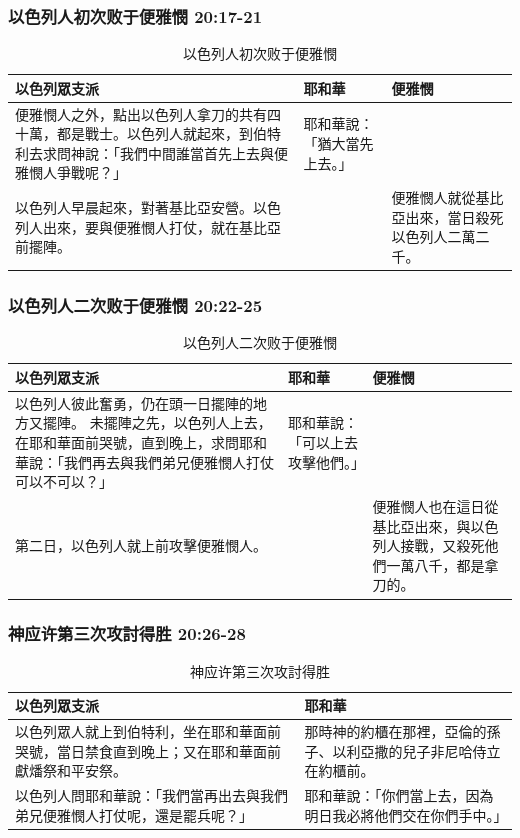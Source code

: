 \subsubsection{以色列人初次败于便雅憫 20:17-21}
\begin{table}[H]
\centering
\begin{tabular}{p{8.6cm}|p{2cm}|p{5.5cm}}\hline
以色列眾支派&耶和華&便雅憫\\\hline
便雅憫人之外，點出以色列人拿刀的共有四十萬，都是戰士。以色列人就起來，到伯特利去求問神說：「我們中間誰當首先上去與便雅憫人爭戰呢？」
&耶和華說：「猶大當先上去。」&\\\hline
以色列人早晨起來，對著基比亞安營。以色列人出來，要與便雅憫人打仗，就在基比亞前擺陣。 &&便雅憫人就從基比亞出來，當日殺死以色列人二萬二千。\\\hline
\end{tabular}
\caption{以色列人初次败于便雅憫}
\end{table}  


\subsubsection{以色列人二次败于便雅憫 20:22-25}
\begin{table}[H]
\centering
\begin{tabular}{p{9.6cm}|p{2.5cm}|p{}}\hline
以色列眾支派&耶和華&便雅憫\\\hline
以色列人彼此奮勇，仍在頭一日擺陣的地方又擺陣。 未擺陣之先，以色列人上去，在耶和華面前哭號，直到晚上，求問耶和華說：「我們再去與我們弟兄便雅憫人打仗可以不可以？」
&耶和華說：「可以上去攻擊他們。」&\\\hline
第二日，以色列人就上前攻擊便雅憫人。&&便雅憫人也在這日從基比亞出來，與以色列人接戰，又殺死他們一萬八千，都是拿刀的。\\\hline
\end{tabular}
\caption{以色列人二次败于便雅憫 }
\end{table}  


\subsubsection{神应许第三次攻討得胜 20:26-28}
\begin{table}[H]
\centering
\begin{tabular}{p{9.6cm}|p{7.5cm}}\hline
以色列眾支派&耶和華\\\hline
以色列眾人就上到伯特利，坐在耶和華面前哭號，當日禁食直到晚上；又在耶和華面前獻燔祭和平安祭。
&那時神的約櫃在那裡，亞倫的孫子、以利亞撒的兒子非尼哈侍立在約櫃前。\\\hline
以色列人問耶和華說：「我們當再出去與我們弟兄便雅憫人打仗呢，還是罷兵呢？」&耶和華說：「你們當上去，因為明日我必將他們交在你們手中。」\\\hline
\end{tabular}
\caption{神应许第三次攻討得胜}
\end{table}  


